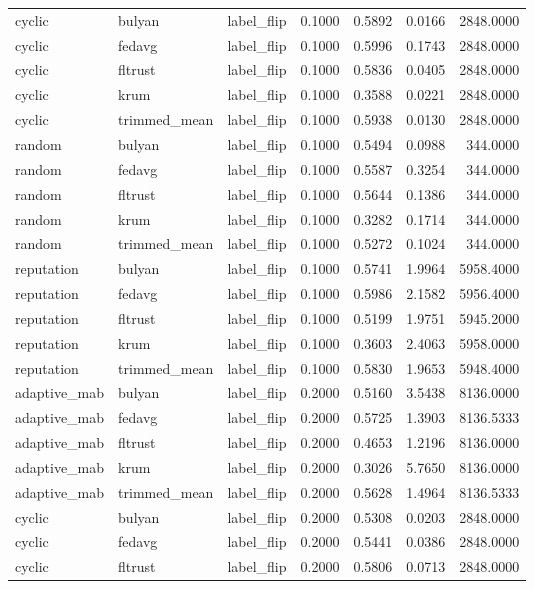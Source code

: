 \begin{tabular}{lllrrrr}
cyclic & bulyan & label_flip & 0.1000 & 0.5892 & 0.0166 & 2848.0000 \\
cyclic & fedavg & label_flip & 0.1000 & 0.5996 & 0.1743 & 2848.0000 \\
cyclic & fltrust & label_flip & 0.1000 & 0.5836 & 0.0405 & 2848.0000 \\
cyclic & krum & label_flip & 0.1000 & 0.3588 & 0.0221 & 2848.0000 \\
cyclic & trimmed_mean & label_flip & 0.1000 & 0.5938 & 0.0130 & 2848.0000 \\
random & bulyan & label_flip & 0.1000 & 0.5494 & 0.0988 & 344.0000 \\
random & fedavg & label_flip & 0.1000 & 0.5587 & 0.3254 & 344.0000 \\
random & fltrust & label_flip & 0.1000 & 0.5644 & 0.1386 & 344.0000 \\
random & krum & label_flip & 0.1000 & 0.3282 & 0.1714 & 344.0000 \\
random & trimmed_mean & label_flip & 0.1000 & 0.5272 & 0.1024 & 344.0000 \\
reputation & bulyan & label_flip & 0.1000 & 0.5741 & 1.9964 & 5958.4000 \\
reputation & fedavg & label_flip & 0.1000 & 0.5986 & 2.1582 & 5956.4000 \\
reputation & fltrust & label_flip & 0.1000 & 0.5199 & 1.9751 & 5945.2000 \\
reputation & krum & label_flip & 0.1000 & 0.3603 & 2.4063 & 5958.0000 \\
reputation & trimmed_mean & label_flip & 0.1000 & 0.5830 & 1.9653 & 5948.4000 \\
adaptive_mab & bulyan & label_flip & 0.2000 & 0.5160 & 3.5438 & 8136.0000 \\
adaptive_mab & fedavg & label_flip & 0.2000 & 0.5725 & 1.3903 & 8136.5333 \\
adaptive_mab & fltrust & label_flip & 0.2000 & 0.4653 & 1.2196 & 8136.0000 \\
adaptive_mab & krum & label_flip & 0.2000 & 0.3026 & 5.7650 & 8136.0000 \\
adaptive_mab & trimmed_mean & label_flip & 0.2000 & 0.5628 & 1.4964 & 8136.5333 \\
cyclic & bulyan & label_flip & 0.2000 & 0.5308 & 0.0203 & 2848.0000 \\
cyclic & fedavg & label_flip & 0.2000 & 0.5441 & 0.0386 & 2848.0000 \\
cyclic & fltrust & label_flip & 0.2000 & 0.5806 & 0.0713 & 2848.0000 \\

\end{tabular}
